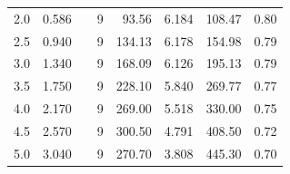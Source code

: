\documentclass[a4paper,12pt]{article}
\begin{document}
\begin{table}[h]
{\begin{tabular}{|r|r|rcrrrr}
2.0                    & 0.586                  & \multicolumn{1}{r|}{}                   & \multicolumn{1}{r|}{9}                      & \multicolumn{1}{r|}{93.56}                   & \multicolumn{1}{r|}{6.184}                  & \multicolumn{1}{r|}{108.47}                  & \multicolumn{1}{r|}{0.80}                \\ \cline{1-2} \cline{4-8} 
2.5                    & 0.940                  & \multicolumn{1}{r|}{}                   & \multicolumn{1}{r|}{9}                      & \multicolumn{1}{r|}{134.13}                  & \multicolumn{1}{r|}{6.178}                  & \multicolumn{1}{r|}{154.98}                  & \multicolumn{1}{r|}{0.79}                \\ \cline{1-2} \cline{4-8} 
3.0                    & 1.340                  & \multicolumn{1}{r|}{}                   & \multicolumn{1}{r|}{9}                      & \multicolumn{1}{r|}{168.09}                  & \multicolumn{1}{r|}{6.126}                  & \multicolumn{1}{r|}{195.13}                  & \multicolumn{1}{r|}{0.79}                \\ \cline{1-2} \cline{4-8} 
3.5                    & 1.750                  & \multicolumn{1}{r|}{}                   & \multicolumn{1}{r|}{9}                      & \multicolumn{1}{r|}{228.10}                  & \multicolumn{1}{r|}{5.840}                  & \multicolumn{1}{r|}{269.77}                  & \multicolumn{1}{r|}{0.77}                \\ \cline{1-2} \cline{4-8} 
4.0                    & 2.170                  & \multicolumn{1}{r|}{}                   & \multicolumn{1}{r|}{9}                      & \multicolumn{1}{r|}{269.00}                  & \multicolumn{1}{r|}{5.518}                  & \multicolumn{1}{r|}{330.00}                  & \multicolumn{1}{r|}{0.75}                \\ \cline{1-2} \cline{4-8} 
4.5                    & 2.570                  & \multicolumn{1}{r|}{}                   & \multicolumn{1}{r|}{9}                      & \multicolumn{1}{r|}{300.50}                  & \multicolumn{1}{r|}{4.791}                  & \multicolumn{1}{r|}{408.50}                  & \multicolumn{1}{r|}{0.72}                \\ \cline{1-2} \cline{4-8} 
5.0                    & 3.040                  & \multicolumn{1}{r|}{}                   & \multicolumn{1}{r|}{9}                      & \multicolumn{1}{r|}{270.70}                  & \multicolumn{1}{r|}{3.808}                  & \multicolumn{1}{r|}{445.30}                  & \multicolumn{1}{r|}{0.70}                \\ \cline{1-2} \cline{4-8} 

\end{tabular}}
\end{table}
\end{document}
